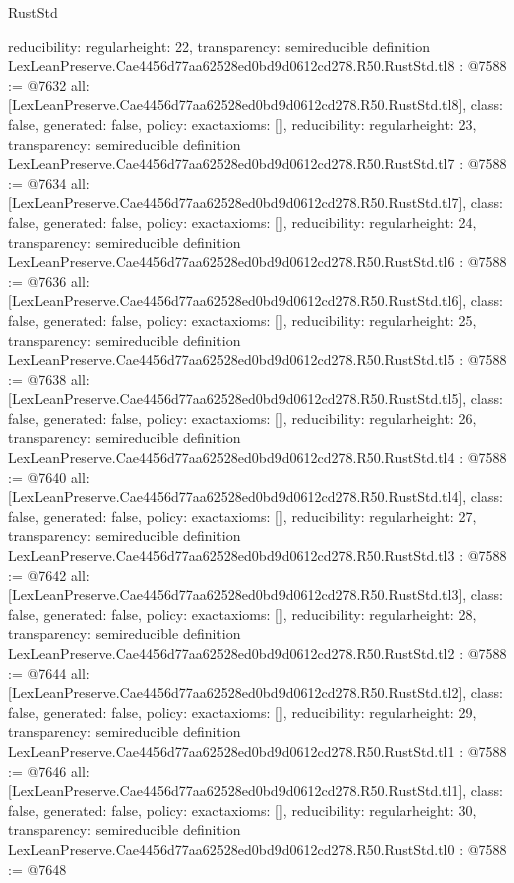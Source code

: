 \begin{lexlean}{RustStd}
\begin{coremodule}
{  reducibility: regular{height: 22},
  transparency: semireducible
}
definition LexLeanPreserve.Cae4456d77aa62528ed0bd9d0612cd278.R50.RustStd.tl8 : @7588 := @7632 {
  all: [LexLeanPreserve.Cae4456d77aa62528ed0bd9d0612cd278.R50.RustStd.tl8],
  class: false,
  generated: false,
  policy: exact{axioms: []},
  reducibility: regular{height: 23},
  transparency: semireducible
}
definition LexLeanPreserve.Cae4456d77aa62528ed0bd9d0612cd278.R50.RustStd.tl7 : @7588 := @7634 {
  all: [LexLeanPreserve.Cae4456d77aa62528ed0bd9d0612cd278.R50.RustStd.tl7],
  class: false,
  generated: false,
  policy: exact{axioms: []},
  reducibility: regular{height: 24},
  transparency: semireducible
}
definition LexLeanPreserve.Cae4456d77aa62528ed0bd9d0612cd278.R50.RustStd.tl6 : @7588 := @7636 {
  all: [LexLeanPreserve.Cae4456d77aa62528ed0bd9d0612cd278.R50.RustStd.tl6],
  class: false,
  generated: false,
  policy: exact{axioms: []},
  reducibility: regular{height: 25},
  transparency: semireducible
}
definition LexLeanPreserve.Cae4456d77aa62528ed0bd9d0612cd278.R50.RustStd.tl5 : @7588 := @7638 {
  all: [LexLeanPreserve.Cae4456d77aa62528ed0bd9d0612cd278.R50.RustStd.tl5],
  class: false,
  generated: false,
  policy: exact{axioms: []},
  reducibility: regular{height: 26},
  transparency: semireducible
}
definition LexLeanPreserve.Cae4456d77aa62528ed0bd9d0612cd278.R50.RustStd.tl4 : @7588 := @7640 {
  all: [LexLeanPreserve.Cae4456d77aa62528ed0bd9d0612cd278.R50.RustStd.tl4],
  class: false,
  generated: false,
  policy: exact{axioms: []},
  reducibility: regular{height: 27},
  transparency: semireducible
}
definition LexLeanPreserve.Cae4456d77aa62528ed0bd9d0612cd278.R50.RustStd.tl3 : @7588 := @7642 {
  all: [LexLeanPreserve.Cae4456d77aa62528ed0bd9d0612cd278.R50.RustStd.tl3],
  class: false,
  generated: false,
  policy: exact{axioms: []},
  reducibility: regular{height: 28},
  transparency: semireducible
}
definition LexLeanPreserve.Cae4456d77aa62528ed0bd9d0612cd278.R50.RustStd.tl2 : @7588 := @7644 {
  all: [LexLeanPreserve.Cae4456d77aa62528ed0bd9d0612cd278.R50.RustStd.tl2],
  class: false,
  generated: false,
  policy: exact{axioms: []},
  reducibility: regular{height: 29},
  transparency: semireducible
}
definition LexLeanPreserve.Cae4456d77aa62528ed0bd9d0612cd278.R50.RustStd.tl1 : @7588 := @7646 {
  all: [LexLeanPreserve.Cae4456d77aa62528ed0bd9d0612cd278.R50.RustStd.tl1],
  class: false,
  generated: false,
  policy: exact{axioms: []},
  reducibility: regular{height: 30},
  transparency: semireducible
}
definition LexLeanPreserve.Cae4456d77aa62528ed0bd9d0612cd278.R50.RustStd.tl0 : @7588 := @7648 {
}
\end{coremodule}
\end{lexlean}
